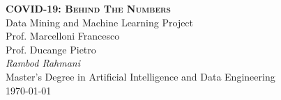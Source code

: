 \documentclass[11pt,a4paper]{article}
\begin{document}
\begin{center}
	\huge{\bfseries{\scshape{COVID-19: Behind The Numbers}}}\\
	\vspace{1.0cm}
	\large{Data Mining and Machine Learning Project}\\
	\vspace{0.2cm}
	\large{Prof. Marcelloni Francesco}\\
	\vspace{0.2cm}
	\large{Prof. Ducange Pietro}\\
	\vspace{1.0cm}
	\large\textit{Rambod Rahmani}\\
	\vspace{0.2cm}
	\scriptsize{Master's Degree in Artificial Intelligence and
	Data Engineering}\\
	\vspace{1.0cm}
	\normalsize{\today}
\end{center}

\vspace{2.0cm}
\tableofcontents

\newpage
\end{document}
